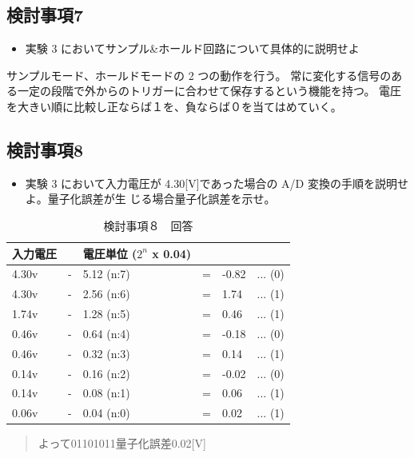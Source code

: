 \documentclass[10pt]{article}
\begin{document}
\subsection{検討事項7}

\begin{itemize}
    \item 実験 3 においてサンプル&ホールド回路について具体的に説明せよ 
\end{itemize}
    サンプルモード、ホールドモードの 2 つの動作を行う。             常に変化する信号のある一定の段階で外からのトリガーに合わせて保存するという機能を持つ。
    電圧を大きい順に比較し正ならば１を、負ならば０を当てはめていく。 

 \subsection{検討事項8}
 \begin{itemize}
     \item 実験 3 において入力電圧が 4.30[V]であった場合の A/D 変換の手順を説明せよ。量子化誤差が生 じる場合量子化誤差を示せ。 
 \end{itemize}
 \begingroup
\setlength{\tabcolsep}{5pt} %
\renewcommand{\arraystretch}{1.5} %
\begin{table}[H]
    \centering
    \caption{検討事項８　回答}
	\begin{tabular}{|llllll|}
	    \hline
	    入力電圧 &  & 電圧単位 ($2^n$ x 0.04) &  & & \\[0.5ex]
		\hline\hline
		4.30v　& - & 5.12 (n:7) & = & -0.82 & ... (0)	 \\ \hline
		4.30v　& - & 2.56 (n:6) & = & 1.74 & ... (1)	 \\ \hline
		1.74v　& - & 1.28 (n:5) & = & 0.46 & ... (1)	 \\ \hline
		0.46v　& - & 0.64 (n:4) & = & -0.18 & ... (0)	 \\ \hline
		0.46v　& - & 0.32 (n:3) & = & 0.14 & ... (1)	 \\ \hline
		0.14v　& - & 0.16 (n:2) & = & -0.02 & ... (0)	 \\ \hline
		0.14v　& - & 0.08 (n:1) & = & 0.06 & ... (1)	 \\ \hline
		0.06v　& - & 0.04 (n:0) & = & 0.02 & ... (1)	 \\ \hline
		
	\end{tabular}
\end{table} 
\endgroup

\begin{quote}
    \centering
    よって01101011量子化誤差0.02[V]
\end{quote}
\end{document}
